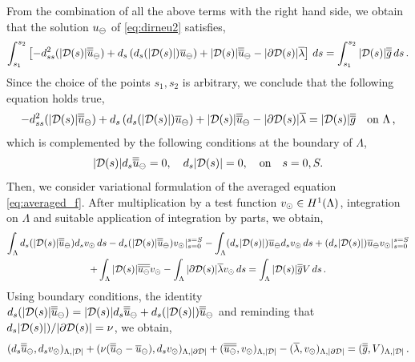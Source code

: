\documentclass[r]{siamart171218}
\begin{document}
From the combination of all the above terms with the right hand side, we obtain that the solution $u_{\ominus}$ of \eqref{eq:dirneu2} satisfies,
\begin{equation*}
\int_{s_1}^{s_2} \left[ 
-d_{ss}^2 (|\mathcal{D}(s)|\overline{\overline{u}}_{\ominus}) +  d_s\left(d_s(|\mathcal{D}(s)|) \overline{u}_{\ominus}\right) + |\mathcal{D}(s)|\overline{\overline{u}}_{\ominus} 
- |\partial\mathcal{D}(s)| \overline{\lambda} 
\right] \, ds = \int_{s_1}^{s_2} |\mathcal{D}(s)| \overline{\overline{g}}\, ds \,.
\end{equation*}
Since the choice of the points $s_1,s_2$ is arbitrary, we conclude that the following equation holds true,
\begin{equation}\label{eq:averaged_f}
-d_{ss}^2 (|\D(s)|\avrd{u}_{\ominus}) +  d_s\left(d_s(|\D(s)|) \avrc{u}_{\ominus}\right) + |\D(s)|\avrd{u}_{\ominus} 
- |\partial\mathcal{D}(s)| \avrc{\lambda}
= |\mathcal{D}(s)| \avrd{g} \quad \text{on} \ \Lambda\,,
\end{equation}
which is complemented by the following conditions at the boundary of $\Lambda$,
\begin{equation}\label{eq:averaged_f_boundary}
|\D(s)| d_s \avrd{u}_{\ominus} = 0, \quad d_s |\D(s)| = 0, \quad \text{on} \quad s=0,S.
\end{equation}
Then, we consider variational formulation of the averaged equation \eqref{eq:averaged_f}.
After multiplication by a test function $v_{\odot} \in H^1(\Lambda)$, integration on $\Lambda$ and suitable application of integration by parts, we obtain,
\begin{multline*}
\int_\Lambda d_s (|\mathcal{D}(s)| \overline{\overline{u}}_{\ominus} ) d_s v_{\odot} \, ds - d_s (|\mathcal{D}(s)| \overline{\overline{u}}_{\ominus} ) v_{\odot} |_{s=0}^{s=S}
- \int_\Lambda (d_s |\mathcal{D}(s)|)\overline{u}_{\ominus} d_s v_{\odot} \, ds + (d_s |\mathcal{D}(s)|) \overline{u}_{\ominus} v_{\odot} |_{s=0}^{s=S}
\\
+\int_\Lambda |\mathcal{D}(s)| \overline{\overline{u_\ominus}} v_{\odot} - \int_\Lambda |\partial\mathcal{D}(s)| \overline{\lambda} v_{\odot} \, ds
= \int_\Lambda |\mathcal{D}(s)| \overline{\overline{g}} V\, ds\,.
\end{multline*}
Using boundary conditions, 
the identity $d_s (|\mathcal{D}(s)| \overline{\overline{u}}_{\ominus} ) = |\mathcal{D}(s)| d_s \overline{\overline{u}}_{\ominus} + d_s (|\mathcal{D}(s)|) \overline{\overline{u}}_{\ominus}$
and reminding that $d_s |\mathcal{D}(s)|)/|\partial\mathcal{D}(s)| = \nu$,
we obtain,
\begin{equation}\label{eq:averaged_f_weak}
(d_s \avrd{u}_{\ominus}, d_s \vd )_{\Lambda,|\D|} 
+ ( \nu (\avrd{u}_{\ominus} - \avrc{u}_{\ominus}), d_s \vd)_{\Lambda,|\DD|} +(\avrd{u_\ominus}, \vd)_{\Lambda, |\D|}
- (\avrc{\lambda},\vd)_{\Lambda,|\DD|}
= (\avrd{g},V)_{\Lambda,|\D|}\,.
\end{equation}
\end{document}
